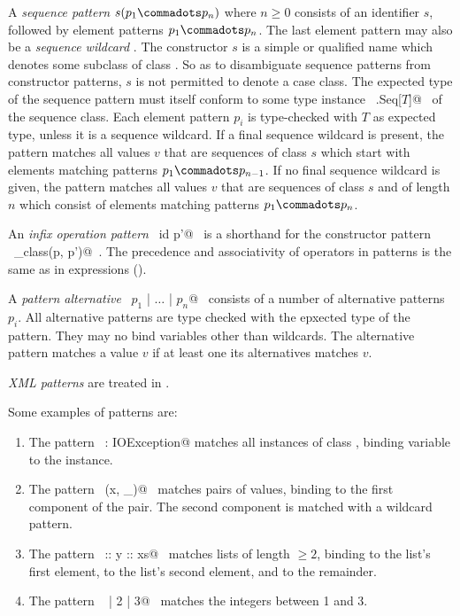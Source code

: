 A {\em sequence pattern} $s(p_1 \commadots p_n)$ where $n \geq 0$
consists of an identifier $s$, followed by element patterns $p_1
\commadots p_n$. The last element pattern may also be a {\em sequence wildcard}
\code{_*}. The constructor $s$ is a simple or qualified name
which denotes some subclass of class . So as to
disambiguate sequence patterns from constructor patterns, $s$ is not
permitted to denote a case class. The expected type of the sequence
pattern must itself conform to some type instance
~\lstinline@scala.Seq[$T$]@~ of the sequence class.  Each element
pattern $p_i$ is type-checked with $T$ as expected type, unless it is
a sequence wildcard. If a final sequence wildcard is present, the
pattern matches all values $v$ that are sequences of class $s$ which
start with elements matching patterns $p_1 \commadots p_{n-1}$.  If no
final sequence wildcard is given, the pattern matches all values $v$
that are sequences of class $s$ and of length $n$ which consist of
elements matching patterns $p_1 \commadots p_n$.

An {\em infix operation pattern} ~\lstinline@p id p'@~ is a shorthand for the
constructor pattern ~\lstinline@id_class(p, p')@~.  The precedence and
associativity of operators in patterns is the same as in expressions
().

A {\em pattern alternative} ~\lstinline@$p_1$ | $\ldots$ | $p_n$@~
consists of a number of alternative patterns $p_i$. All alternative
patterns are type checked with the epxected type of the pattern. They
may no bind variables other than wildcards. The alternative pattern 
matches a value $v$ if at least one its alternatives matches $v$.

{\em XML patterns} are treated in .

\example Some examples of patterns are:
\begin{enumerate}
\item
The pattern ~\lstinline@ex: IOException@ matches all instances of class
\lstinline@IOException@, binding variable \verb@ex@ to the instance.
\item
The pattern ~\lstinline@(x, _)@~ matches pairs of values, binding \lstinline@x@ to
the first component of the pair. The second component is matched
with a wildcard pattern.
\item
The pattern ~\lstinline@x :: y :: xs@~ matches lists of length $\geq 2$,
binding \lstinline@x@ to the list's first element, \lstinline@y@ to the list's
second element, and \lstinline@xs@ to the remainder.
\item
The pattern ~ | 2 | 3@~ matches the integers between 1 and 3.
\end{enumerate}


